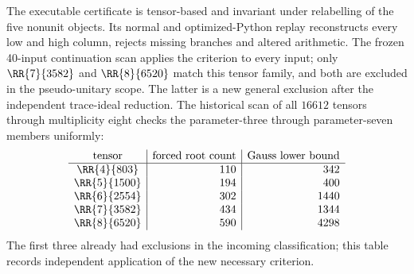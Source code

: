The executable certificate is tensor-based and invariant under relabelling
of the five nonunit objects.  Its normal and optimized-Python replay
reconstructs every low and high column, rejects missing branches and
altered arithmetic.  The frozen
40-input continuation scan applies the criterion to every input; only
$\RR{7}{3582}$ and $\RR{8}{6520}$ match this tensor family, and both are
excluded in the pseudo-unitary scope.  The latter is a new general
exclusion after the independent trace-ideal reduction. The historical scan
of all $16612$ tensors through multiplicity eight checks the parameter-three through parameter-seven
members uniformly:
\[
\begin{array}{c|r|r}
\text{tensor}&\text{forced root count}&\text{Gauss lower bound}\\\hline
\RR{4}{803}&110&342\\
\RR{5}{1500}&194&400\\
\RR{6}{2554}&302&1440\\
\RR{7}{3582}&434&1344\\
\RR{8}{6520}&590&4298
\end{array}
\]
The first three already had exclusions in the incoming classification;
this table records independent application of the new necessary criterion.
